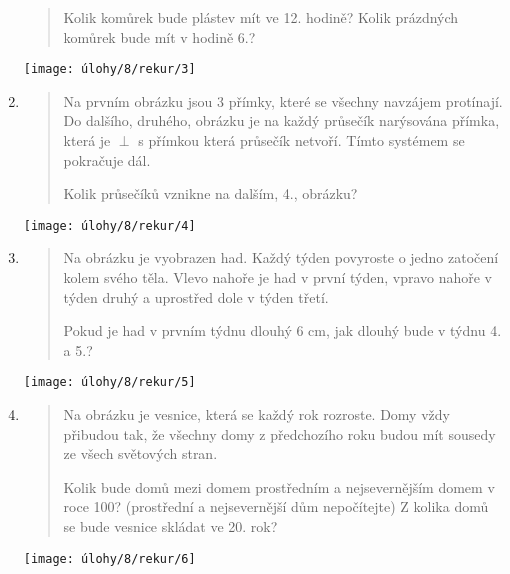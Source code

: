 \begin{enumerate}
\begin{minipage}[t]{\linewidth}
\begin{quote}
            Kolik komůrek bude plástev mít ve 12. hodině? Kolik prázdných komůrek bude mít v hodině 6.?
        \end{quote}
        \centering
        \texttt{[image: úlohy/8/rekur/3]}
    \end{minipage}

    \item
    \begin{minipage}[t]{\linewidth}
        \begin{quote}
            Na prvním obrázku jsou 3 přímky, které se všechny navzájem protínají. Do dalšího, druhého, obrázku je na každý průsečík narýsována přímka, která je $\perp$ s přímkou která průsečík netvoří. Tímto systémem se pokračuje dál.

            Kolik průsečíků vznikne na dalším, 4., obrázku?
        \end{quote}
        \centering
        \texttt{[image: úlohy/8/rekur/4]}
    \end{minipage}

    \item
    \begin{minipage}[t]{\linewidth}
        \begin{quote}
            Na obrázku je vyobrazen had. Každý týden povyroste o jedno zatočení kolem svého těla. Vlevo nahoře je had v první týden, vpravo nahoře v týden druhý a uprostřed dole v týden třetí.

            Pokud je had v prvním týdnu dlouhý 6 cm, jak dlouhý bude v týdnu 4. a 5.?
        \end{quote}
        \centering
        \texttt{[image: úlohy/8/rekur/5]}
    \end{minipage}

    \item
    \begin{minipage}[t]{\linewidth}
        \begin{quote}
            Na obrázku je vesnice, která se každý rok rozroste. Domy vždy přibudou tak, že všechny domy z předchozího roku budou mít sousedy ze všech světových stran.

            Kolik bude domů mezi domem prostředním a nejsevernějším domem v roce 100? (prostřední a nejsevernější dům nepočítejte) Z kolika domů se bude vesnice skládat ve 20. rok?
        \end{quote}
        \centering
        \texttt{[image: úlohy/8/rekur/6]}
    \end{minipage}


\end{enumerate}


